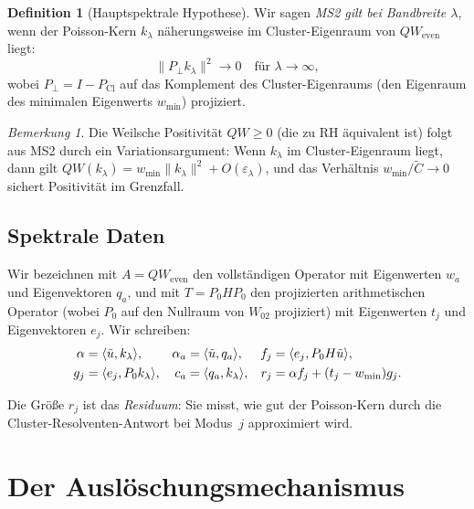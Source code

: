 \documentclass[12pt,a4paper]{article}
\theoremstyle{definition}
\newtheorem{definition}[theorem]{Definition}
\theoremstyle{remark}
\newtheorem{remark}[theorem]{Bemerkung}
\newcommand{\Cl}{\mathrm{Cl}}
\newcommand{\ip}[2]{\langle #1, #2 \rangle}
\newcommand{\norm}[1]{\| #1 \|}
\newcommand{\utilde}{\tilde{u}}
\newcommand{\Ctilde}{\tilde{C}}
\newcommand{\wmin}{w_{\min}}
\begin{document}
\begin{definition}[Hauptspektrale Hypothese]
\label{def:MS2}
Wir sagen \emph{MS2 gilt bei Bandbreite $\lambda$}, wenn der Poisson-Kern
$k_\lambda$ näherungsweise im Cluster-Eigenraum von $QW_{\mathrm{even}}$ liegt:
\begin{equation}
\label{eq:MS2}
\norm{P_\perp k_\lambda}^2 \to 0 \quad \text{für } \lambda \to \infty,
\end{equation}
wobei $P_\perp = I - P_{\Cl}$ auf das Komplement des Cluster-Eigenraums
(den Eigenraum des minimalen Eigenwerts $\wmin$) projiziert.
\end{definition}

\begin{remark}
Die Weilsche Positivität $QW \geq 0$ (die zu RH äquivalent ist) folgt
aus MS2 durch ein Variationsargument: Wenn $k_\lambda$ im Cluster-Eigenraum
liegt, dann gilt $QW(k_\lambda) = \wmin \norm{k_\lambda}^2 + O(\varepsilon_\lambda)$,
und das Verhältnis $\wmin / \Ctilde \to 0$ sichert Positivität im Grenzfall.
\end{remark}

\subsection{Spektrale Daten}

Wir bezeichnen mit $A = QW_{\mathrm{even}}$ den vollständigen Operator mit
Eigenwerten $w_a$ und Eigenvektoren $q_a$, und mit $T = P_0 H P_0$
den projizierten arithmetischen Operator (wobei $P_0$ auf den Nullraum
von $W_{02}$ projiziert) mit Eigenwerten $t_j$ und Eigenvektoren $e_j$.
Wir schreiben:
\begin{align}
\alpha &= \ip{\utilde}{k_\lambda}, &
\alpha_a &= \ip{\utilde}{q_a}, &
f_j &= \ip{e_j}{P_0 H \utilde}, \\
g_j &= \ip{e_j}{P_0 k_\lambda}, &
c_a &= \ip{q_a}{k_\lambda}, &
r_j &= \alpha f_j + (t_j - \wmin) g_j. \notag
\end{align}

Die Größe $r_j$ ist das \emph{Residuum}: Sie misst, wie gut der Poisson-Kern
durch die Cluster-Resolventen-Antwort bei Modus~$j$ approximiert wird.

\section{Der Auslöschungsmechanismus}
\label{sec:mechanism}
\end{document}
